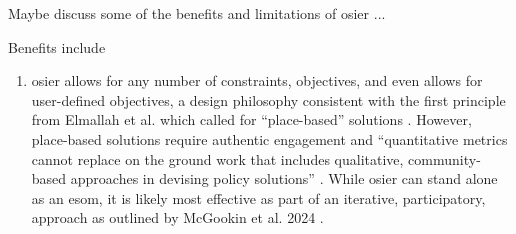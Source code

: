 Maybe discuss some of the benefits and limitations of \ac{osier} ...

Benefits include
\begin{enumerate}
    \item \ac{osier} allows for any number of constraints, objectives, and even
    allows for user-defined objectives, a design philosophy consistent with the
    first principle from Elmallah et al. which called for ``place-based''
    solutions \cite{elmallah_frontlining_2022}. However, place-based solutions
    require authentic engagement and ``quantitative metrics cannot replace on
    the ground work that includes qualitative, community-based approaches in
    devising policy solutions'' \cite{elmallah_frontlining_2022}. While \ac{osier}
    can stand alone as an \ac{esom}, it is likely most effective as part of an 
    iterative, participatory, approach as outlined by McGookin et al. 2024 
    \cite{mcgookin_advancing_2024}.
\end{enumerate}